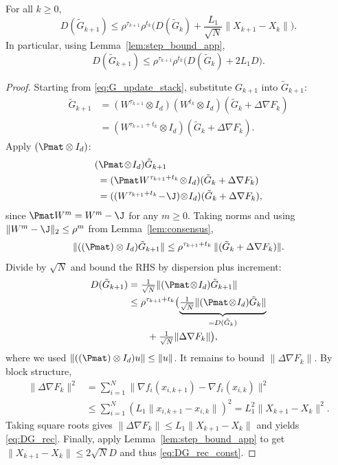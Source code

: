 \documentclass[review,onefignum,onetabnum]{siamart171218}
\begin{document}
\begin{lemma}\label{lem:DG_rec}
For all $k\ge0$,
\begin{equation}\label{eq:DG_rec}
D(\tilde G_{k+1})
\le \rho^{\tau_{k+1}}\rho^{t_k}\Big(D(\tilde G_k)+\frac{L_1}{\sqrt N}\|X_{k+1}-X_k\|\Big).
\end{equation}
In particular, using Lemma~\ref{lem:step_bound_app},
\begin{equation}\label{eq:DG_rec_const}
D(\tilde G_{k+1})
\le \rho^{\tau_{k+1}}\rho^{t_k}\Big(D(\tilde G_k)+2L_1D\Big).
\end{equation}
\end{lemma}
\begin{proof}
Starting from \eqref{eq:G_update_stack}, substitute $G_{k+1}$ into $\tilde G_{k+1}$:
\begin{align*}
\tilde G_{k+1}
&=(W^{\tau_{k+1}}\!\otimes\! I_d)(W^{t_k}\!\otimes\! I_d)(\tilde G_k\!+\!\Delta\nabla F_k)\\
&=(W^{\tau_{k+1}+t_k}\!\otimes\! I_d)(\tilde G_k\!+\!\Delta\nabla F_k).
\end{align*}
Apply $(\Pmat\otimes I_d)$:
\begin{align*}
&(\Pmat\!\otimes\! I_d)\tilde G_{k+1}\\
&\;=(\Pmat W^{\tau_{k+1}+t_k}\!\otimes\! I_d)(\tilde G_k+\Delta\nabla F_k)\\
&\;=((W^{\tau_{k+1}+t_k}\!-\!\J)\!\otimes\! I_d)(\tilde G_k+\Delta\nabla F_k),
\end{align*}
since $\Pmat W^m=W^m-\J$ for any $m\ge0$.
Taking norms and using $\|W^{m}-\J\|_2\le \rho^{m}$ from Lemma~\ref{lem:consensus},
\[
\|((\Pmat)\otimes I_d)\tilde G_{k+1}\|
\le \rho^{\tau_{k+1}+t_k}\,\|(\tilde G_k+\Delta\nabla F_k)\|.
\]
Divide by $\sqrt N$ and bound the RHS by dispersion plus increment:
\begin{align*}
D(\tilde G_{k+1})
&=\tfrac1{\sqrt N}\|(\Pmat\!\otimes\! I_d)\tilde G_{k+1}\|\\
&\le \rho^{\tau_{k+1}+t_k}\bigl(
\underbrace{\tfrac1{\sqrt N}\|(\Pmat\!\otimes\! I_d)\tilde G_k\|}_{=D(\tilde G_k)}\\
&\qquad+\tfrac1{\sqrt N}\|\Delta\nabla F_k\|\bigr),
\end{align*}
where we used $\|((\Pmat)\otimes I_d)u\|\le \|u\|$.
It remains to bound $\|\Delta\nabla F_k\|$.
By block structure,
\begin{align*}
\|\Delta\nabla F_k\|^2
&=\textstyle\sum_{i=1}^N\|\nabla f_i(x_{i,k+1})\!-\!\nabla f_i(x_{i,k})\|^2\\
&\le \textstyle\sum_{i=1}^N (L_1\|x_{i,k+1}\!-\!x_{i,k}\|)^2
=L_1^2\|X_{k+1}\!-\!X_k\|^2.
\end{align*}
Taking square roots gives $\|\Delta\nabla F_k\|\le L_1\|X_{k+1}-X_k\|$ and yields \eqref{eq:DG_rec}.
Finally, apply Lemma~\ref{lem:step_bound_app} to get $\|X_{k+1}-X_k\|\le 2\sqrt N D$ and thus \eqref{eq:DG_rec_const}.
\end{proof}
\end{document}
